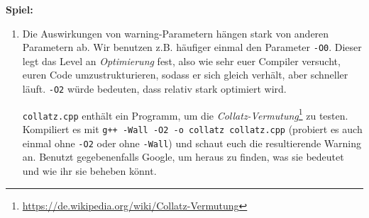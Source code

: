 
\textbf{Spiel:}
\begin{enumerate}
    \item Die Auswirkungen von warning-Parametern hängen stark von anderen
        Parametern ab. Wir benutzen z.B. häufiger einmal den Parameter
        \texttt{-O0}. Dieser legt das Level an \emph{Optimierung} fest, also
        wie sehr euer Compiler versucht, euren Code umzustrukturieren, sodass
        er sich gleich verhält, aber schneller läuft. \texttt{-O2} würde
        bedeuten, dass relativ stark optimiert wird.

        \texttt{collatz.cpp} enthält ein Programm, um die
        \emph{Collatz-Vermutung}\footnote{\url{https://de.wikipedia.org/wiki/Collatz-Vermutung}}
        zu testen. Kompiliert es mit \texttt{g++ -Wall -O2 -o collatz
        collatz.cpp} (probiert es auch einmal ohne \texttt{-O2} oder ohne
        \texttt{-Wall}) und schaut euch die resultierende Warning an. Benutzt
        gegebenenfalls Google, um heraus zu finden, was sie bedeutet und wie
        ihr sie beheben könnt.
\end{enumerate}

